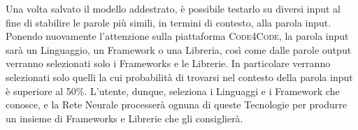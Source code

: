 Una volta salvato il modello addestrato, è possibile testarlo su diversi input al fine di stabilire le parole più simili, in termini di contesto, alla parola input. Ponendo nuovamente l'attenzione sulla piattaforma \textsc{Code4Code}, la parola input sarà un Linguaggio, un Framework o una Libreria, così come dalle parole output verranno selezionati solo i Frameworks e le Librerie. In particolare verranno selezionati solo quelli la cui probabilità di trovarsi nel contesto della parola input è superiore al 50\%. L'utente, dunque, seleziona i Linguaggi e i Framework che conosce, e la Rete Neurale processerà ognuna di queste Tecnologie per produrre un insieme di Frameworks e Librerie che gli consiglierà.
\newpage
